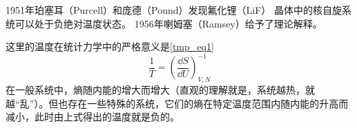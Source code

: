 
1951年珀塞耳（Purcell）和庞德（Pound）发现氟化锂（LiF） 晶体中的核自旋系统可以处于负绝对温度状态。
1956年喇姆塞（Ramsey）给予了理论解释。\cite{热统}

这里的温度在统计力学中的严格意义是\autoref{tmp_eq1}~
\begin{equation}
\frac{1}{T}=\left(\frac{\dd S}{\dd U}\right)_{V,N}^{-1}
\end{equation}
在一般系统中，熵随内能的增大而增大（直观的理解就是，系统越热，就越“乱”）。但也存在一些特殊的系统，它们的熵在特定温度范围内随内能的升高而减小，此时由上式得出的温度就是负的。